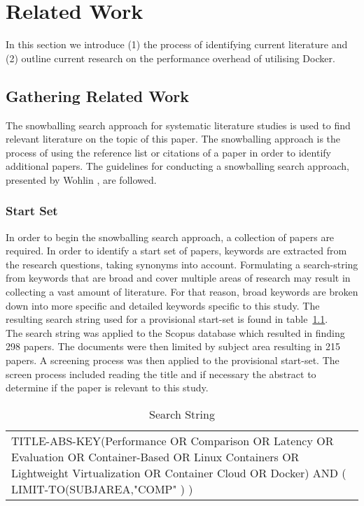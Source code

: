 \iffalse  \fi
\chapter{Related Work}
In this section we introduce (1) the process of identifying current literature and (2) outline current research on the performance overhead of utilising Docker.

\section{Gathering Related Work}
The snowballing search approach for systematic literature studies is used to find relevant literature on the topic of this paper. The snowballing approach is the process of using the reference list or citations of a paper in order to identify additional papers. The guidelines for conducting a snowballing search approach, presented by Wohlin \cite{Wohlin}, are followed. 

\subsection{Start Set}
In order to begin the snowballing search approach, a collection of papers are required. In order to identify a start set of papers, keywords are extracted from the research questions, taking synonyms into account. Formulating a search-string from keywords that are broad and cover multiple areas of research may result in collecting a vast amount of literature. For that reason, broad keywords are broken down into more specific and detailed keywords specific to this study. The resulting search string used for a provisional start-set is found in table~\ref{search-string}. \\

The search string was applied to the Scopus \cite{scopus} database which resulted in finding 298 papers. The documents were then limited by subject area resulting in 215 papers. A screening process was then applied to the provisional start-set. The screen process included reading the title and if necessary the abstract to determine if the paper is relevant to this study. 

\begin{table}[h]
\centering
\begin{tabular}{p{15cm}}
TITLE-ABS-KEY(Performance OR Comparison OR Latency OR Evaluation OR Container-Based OR Linux Containers OR Lightweight Virtualization OR Container Cloud OR Docker) AND ( LIMIT-TO(SUBJAREA,"COMP" ) )
\end{tabular}
\caption{Search String}
\label{search-string}
\end{table}


